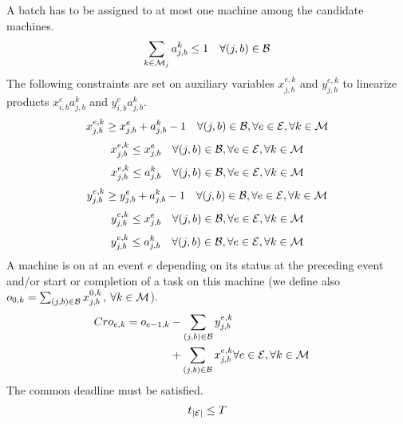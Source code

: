 A batch has to be assigned to at most one machine among the candidate
machines.
\begin{eqnarray}
\sum_{k\in{\cal M}_j}a_{j,b}^k\leq 1\quad \forall (j,b)\in{\cal B}
\end{eqnarray}
The following constraints are set on auxiliary variables
$x_{j,b}^{e,k}$ and $y_{j,b}^{e,k}$ to linearize products
$x_{i,b}^ea_{j,b}^k$ and $y_{i,b}^ea_{j,b}^k$.
\begin{eqnarray}
x_{j,b}^{e,k}\geq x_{j,b}^e+a_{j,b}^k-1\quad\forall (j,b)\in{\cal
  B},\forall e\in{\cal E},\forall k\in{\cal M}
\end{eqnarray}
\begin{eqnarray}
x_{j,b}^{e,k}\leq x_{j,b}^e\quad\forall (j,b)\in{\cal B},\forall
e\in{\cal E},\forall k\in{\cal M}
\end{eqnarray}
\begin{eqnarray}
x_{j,b}^{e,k}\leq a_{j,b}^k\quad\forall (j,b)\in{\cal B},\forall
e\in{\cal E},\forall k\in{\cal M}
\end{eqnarray}
\begin{eqnarray}
y_{j,b}^{e,k}\geq y_{j,b}^e+a_{j,b}^k-1\quad\forall (j,b)\in{\cal
  B},\forall e\in{\cal E},\forall k\in{\cal M}
\end{eqnarray}
\begin{eqnarray}
y_{j,b}^{e,k}\leq x_{j,b}^e\quad\forall (j,b)\in{\cal B},\forall
e\in{\cal E},\forall k\in{\cal M}
\end{eqnarray}
\begin{eqnarray}
y_{j,b}^{e,k}\leq a_{j,b}^k\quad\forall (j,b)\in{\cal B},\forall
e\in{\cal E},\forall k\in{\cal M}
\end{eqnarray}
A machine is on at an event $e$ depending on its status at the
preceding event and/or start or completion of a task on this machine
(we define also $o_{0,k}=\sum_{(j,b) \in {\cal B}}x_{j,b}^{0,k}$,
$\forall k\in{\cal M}$).
\begin{eqnarray}{Cr}
o_{e,k}=o_{e-1,k}-\sum_{(j,b)\in{\cal B}} y_{j,b}^{e,k} \nonumber\\ +
\sum_{(j,b)\in{\cal B}} x_{j,b}^{e,k}&\forall e\in{\cal E},\forall
k\in{\cal M}
\end{eqnarray}
The common deadline must be satisfied.
\begin{eqnarray}
t_{|{\cal E}|}\leq T\label{eq25}
\end{eqnarray}
